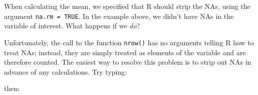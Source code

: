 \documentclass[]{book}
\newenvironment{Shaded}{\begin{snugshade}}{\end{snugshade}}
\newcommand{\KeywordTok}[1]{\textcolor[rgb]{0.13,0.29,0.53}{\textbf{#1}}}
\newcommand{\DataTypeTok}[1]{\textcolor[rgb]{0.13,0.29,0.53}{#1}}
\newcommand{\StringTok}[1]{\textcolor[rgb]{0.31,0.60,0.02}{#1}}
\newcommand{\CommentTok}[1]{\textcolor[rgb]{0.56,0.35,0.01}{\textit{#1}}}
\newcommand{\OperatorTok}[1]{\textcolor[rgb]{0.81,0.36,0.00}{\textbf{#1}}}
\newcommand{\NormalTok}[1]{#1}
\theoremstyle{definition}
\theoremstyle{definition}
\theoremstyle{definition}
\theoremstyle{remark}
\begin{document}
\begin{Shaded}
\end{Shaded}

When calculating the mean, we specified that R should strip the NAs,
using the argument \texttt{na.rm\ =\ TRUE}. In the example above, we
didn't have NAs in the variable of interest. What happens if we
\emph{do}?

Unfortunately, the call to the function \texttt{nrow()} has no arguments
telling R how to treat NAs; instead, they are simply treated as elements
of the variable and are therefore counted. The easiest way to resolve
this problem is to strip out NAs in advance of any calculations. Try
typing:

\begin{Shaded}
\end{Shaded}

then:

\begin{Shaded}
\end{Shaded}
\end{document}
